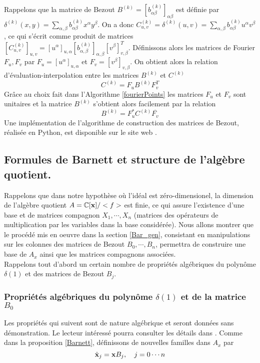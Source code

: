 \documentclass{standalone}
\begin{document}
Rappelons que la matrice de Bezout $B^{(k)} = \left[b^{(k)}_{\alpha\beta}\right]_{\alpha\beta}$ est définie par $\delta^{(k)}(x, y) = \sum_{\alpha,\beta} b^{(k)}_{\alpha\beta} x^\alpha y^\beta$. On a donc $C^{(k)}_{u,v} = \delta^{(k)}(u, v) = \sum_{\alpha,\beta} b^{(k)}_{\alpha\beta} u^\alpha v^\beta$, ce qui s'écrit comme produit de matrices
$\left[C^{(k)}_{u,v}\right]_{u,v} = \left[u^\alpha\right]_{u,\alpha} \left[b^{(k)}_{\alpha,\beta}\right]_{\alpha, \beta} \left[v^\beta\right]_{v, \beta}^T$.
Définissons alors les matrices de Fourier $F_u, F_v$ par $F_u = \left[ u^\alpha \right]_{u, \alpha}$ et $F_v = \left[ v^\beta \right]_{v, \beta}$. On obtient alors la relation d'évaluation-interpolation entre les matrices $B^{(k)}$ et $C^{(k)}$
$$C^{(k)} = F_uB^{(k)} F_v^T$$
 Grâce au choix fait dans l'Algorithme \ref{fourierPoints} les matrices $F_u$ et $F_v$ sont unitaires et la matrice $B^{(k)}$ s'obtient alors facilement par la relation
 \begin{equation}
 B^{(k)} = F_u^*C^{(k)} \overline{F_v}
 \end{equation}
Une implémentation de l'algorithme de construction des matrices de Bezout, réalisée en Python, est disponible sur le site web \cite{jp_code}.

\subsection{Formules de Barnett et structure de l'algèbre quotient.}
Rappelons que dans notre hypothèse où l'idéal est zéro-dimensionel, la dimension de l'algèbre quotient $A = \mathbb{C}[\bold{x}]/<f>$ est finie, ce qui assure l'existence d'une base et de matrices compagnon $X_1,\cdots, X_n$ (matrices des opérateurs de multiplication par les variables dans la base considérée). Nous allons montrer que le procédé mis en oeuvre dans la section \ref{Bar_gen}, consistant en manipulations sur les colonnes des matrices de Bezout $B_0, \cdots, B_n $, permettra de construire une base de $A_x$ ainsi que les matrices compagnons associées.\\
Rappelons tout d'abord un certain nombre de propriétés algébriques du polynôme $\delta(1)$ et des matrices de Bezout $B_j$.

\subsubsection{Propriétés algébriques du polynôme $\delta(1)$ et de la matrice $B_0$}
Les propriétés qui suivent sont de nature algébrique et seront données sans démonstration. Le lecteur intéressé pourra consulter les détails dans \cite{jpc, CM}. Comme dans la proposition \ref{Barnett}, définissons de nouvelles familles dans $A_x$ par
\begin{equation}
		\hat{\bold{x}}_j  =  \bold{x}B_j, \quad j=0\cdots n
\end{equation}
\end{document}
